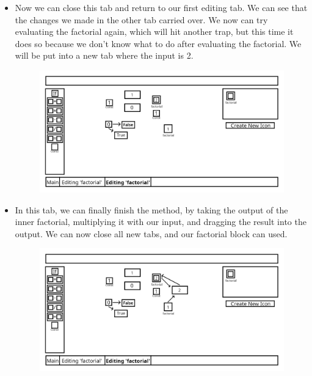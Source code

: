 \documentclass{article}
\begin{document}
\begin{itemize}
            \item
                Now we can close this tab and return to our first editing tab. We can see that the changes we made in the other
                tab carried over. We now can try evaluating the factorial again, which will hit another trap, but this time it
                does so because we don't know what to do after evaluating the factorial. We will be put into a new tab where
                the input is 2.
                \begin{figure}[H]
                    \includegraphics[width=\textwidth]{include/example_factorial_hit_trap_2.png}
                    \centering
                \end{figure}

            \item
                In this tab, we can finally finish the method, by taking the output of the inner factorial, multiplying it with
                our input, and dragging the result into the output. We can now close all new tabs, and our factorial block can
                used.
                \begin{figure}[H]
                    \includegraphics[width=\textwidth]{include/example_factorial_finish_false_branch.png}
                    \centering
                \end{figure}

        \end{itemize}
\end{document}
